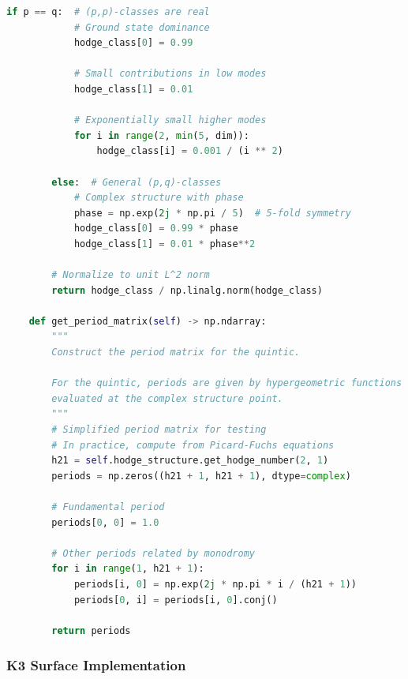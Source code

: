 \documentclass[11pt,a4paper]{article}
\theoremstyle{plain}
\theoremstyle{definition}
\theoremstyle{remark}
\begin{document}
\begin{lstlisting}[language=Python, caption=Calabi-Yau Threefold - Complete Implementation]
        if p == q:  # (p,p)-classes are real
            # Ground state dominance
            hodge_class[0] = 0.99
            
            # Small contributions in low modes
            hodge_class[1] = 0.01
            
            # Exponentially small higher modes
            for i in range(2, min(5, dim)):
                hodge_class[i] = 0.001 / (i ** 2)
                
        else:  # General (p,q)-classes
            # Complex structure with phase
            phase = np.exp(2j * np.pi / 5)  # 5-fold symmetry
            hodge_class[0] = 0.99 * phase
            hodge_class[1] = 0.01 * phase**2
            
        # Normalize to unit L^2 norm
        return hodge_class / np.linalg.norm(hodge_class)
    
    def get_period_matrix(self) -> np.ndarray:
        """
        Construct the period matrix for the quintic.
        
        For the quintic, periods are given by hypergeometric functions
        evaluated at the complex structure point.
        """
        # Simplified period matrix for testing
        # In practice, compute from Picard-Fuchs equations
        h21 = self.hodge_structure.get_hodge_number(2, 1)
        periods = np.zeros((h21 + 1, h21 + 1), dtype=complex)
        
        # Fundamental period
        periods[0, 0] = 1.0
        
        # Other periods related by monodromy
        for i in range(1, h21 + 1):
            periods[i, 0] = np.exp(2j * np.pi * i / (h21 + 1))
            periods[0, i] = periods[i, 0].conj()
            
        return periods
\end{lstlisting}

\subsubsection{K3 Surface Implementation}
\end{document}
